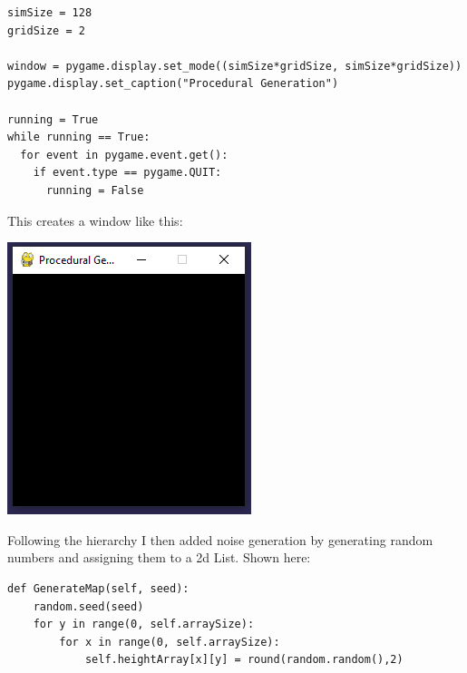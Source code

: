 \begin{flushleft}
\begin{enumerate}
\begin{verbatim}
simSize = 128
gridSize = 2

window = pygame.display.set_mode((simSize*gridSize, simSize*gridSize))
pygame.display.set_caption("Procedural Generation")

running = True
while running == True:
  for event in pygame.event.get():
    if event.type == pygame.QUIT:
      running = False
            \end{verbatim}

            \vspace{0.5cm}

            \large
            This creates a window like this: \\ 
            \vspace{0.5cm}
            \centerline{\includegraphics{Images/Prototype/CreateWindowExample.PNG}}

            \vspace{0.5cm}

            Following the hierarchy I then added noise generation by generating random numbers and 
            assigning them to a 2d List. Shown here: 
            
            \begin{verbatim}
def GenerateMap(self, seed):
    random.seed(seed)
    for y in range(0, self.arraySize):
        for x in range(0, self.arraySize):
            self.heightArray[x][y] = round(random.random(),2)
            \end{verbatim}

            \vspace{0.5cm}


\end{enumerate}
\end{flushleft}
